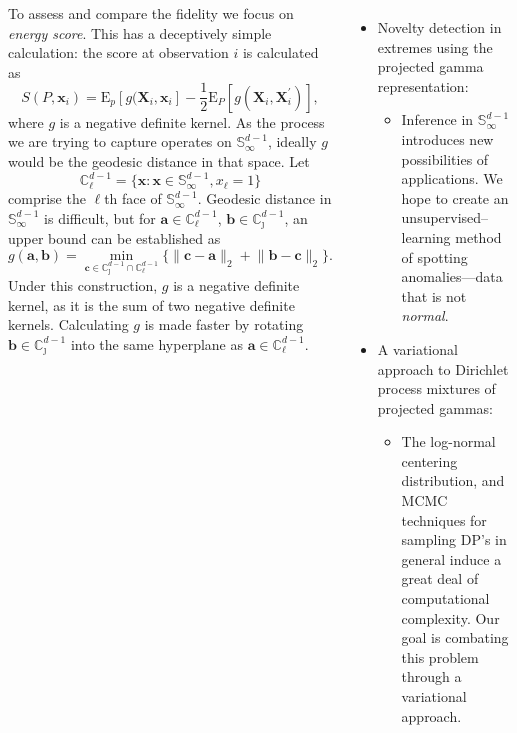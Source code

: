 \documentclass[20pt, a0paper, landscape, colspace=9mm, subcolspace=4mm, blockverticalspace=9mm, innermargin=8mm, margin=0mm]{tikzposter}
\begin{document}
\begin{columns}
    {
    To assess and compare the fidelity we focus on \emph{energy score}.  This has a deceptively simple calculation: the score at observation $i$ is calculated as
    \[
        S(P,\bm{x}_i) = \text{E}_p\left[g(\bm{X}_i,\bm{x}_i\right] -
        \frac{1}{2}\text{E}_P\left[g(\bm{X}_i,\bm{X}_i^{\prime})\right],
    \]
    where $g$ is a negative definite kernel.  As the process we are trying to capture operates 
    on $\mathbb{S}_{\infty}^{d-1}$, ideally $g$ would be the geodesic distance in
    that space. Let \[\mathbb{C}_\ell^{d-1} = \lbrace
    \bm{x} : \bm{x} \in \mathbb{S}_{\infty}^{d-1}, x_{\ell} = 1\rbrace\] comprise the $\ell$th
    face of $\mathbb{S}_{\infty}^{d-1}$.  Geodesic distance in
    $\mathbb{S}_{\infty}^{d-1}$ is difficult, but for
    $\bm{a}\in\mathbb{C}_{\ell}^{d-1}$, $\bm{b}\in\mathbb{C}_{\jmath}^{d-1}$, 
    an upper bound can be established as
    \[
        g(\bm{a},\bm{b}) = \min\limits_{\bm{c}\in\mathbb{C}_{\jmath}^{d-1}\cap\mathbb{C}_{\ell}^{d-1}}\lbrace\lVert \bm{c} - \bm{a}\rVert_2 + \lVert \bm{b} - \bm{c}\rVert_2\rbrace.
    \]
    Under this construction, $g$ is a negative definite kernel, as it is the sum of two 
    negative definite kernels.  Calculating $g$ is made faster by rotating 
    $\bm{b}\in\mathbb{C}_{\jmath}^{d-1}$ into the same hyperplane as $\bm{a}\in\mathbb{C}_{\ell}^{d-1}$.
    }


    
    {
    \begin{itemize}[noitemsep]
        \item Novelty detection in extremes using the projected gamma representation:
            \begin{itemize}[noitemsep]
                \item Inference in $\mathbb{S}_{\infty}^{d-1}$ introduces new possibilities of applications.  We hope to create an unsupervised--learning method of spotting anomalies---data that is not \emph{normal}.
            \end{itemize}
        \item A variational approach to Dirichlet process mixtures of projected gammas:
        \begin{itemize}[noitemsep]
            \item The log-normal centering distribution, and MCMC techniques for sampling DP's in general induce a great deal of computational complexity.  Our goal is combating this problem through a variational approach.
        \end{itemize}
    \end{itemize}
    }


\end{columns}
\end{document}
